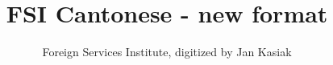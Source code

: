 \documentclass[UTF8]{ctexart}
\begin{document}
\title{FSI Cantonese - new format}
\author{Foreign Services Institute, digitized by Jan Kasiak}

\maketitle

\tableofcontents








\end{document}
